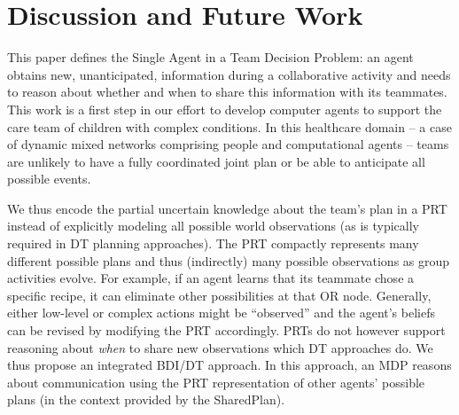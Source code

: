 \section{Discussion and Future Work}
\label{sec:con}





This paper defines the Single Agent in a Team Decision Problem: an agent obtains new, unanticipated, information during a collaborative activity and needs to reason about whether and when to share this information with its teammates. This work is a first step in our effort to develop computer agents to support the care team of children with complex conditions. In this healthcare domain -- a case of dynamic mixed networks comprising people and computational agents -- teams are unlikely to have a fully coordinated joint plan or be able to anticipate all possible events. 


We thus encode the 
partial uncertain knowledge about the team's plan in a PRT instead of explicitly modeling all possible world observations (as is typically required in DT planning approaches). The PRT compactly represents many different possible plans and thus (indirectly) many possible observations as group activities evolve. For example, if an agent learns that its teammate chose a specific recipe, it can eliminate other possibilities at that OR node. Generally, either low-level or complex actions might be ``observed'' and the agent's beliefs can be revised by modifying the PRT accordingly. PRTs do not however support reasoning about {\em when} to share new observations which  DT approaches do. We thus propose an integrated BDI/DT approach. In this approach, an MDP reasons about communication using the PRT representation of other agents' possible plans (in the context provided by the SharedPlan).


